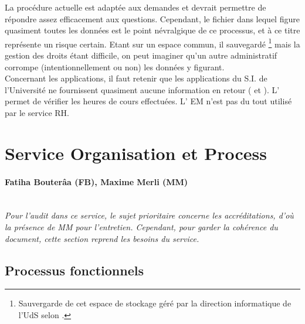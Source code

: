 \documentclass{book}
\begin{document}
La procédure actuelle est adaptée aux  demandes et devrait permettre de répondre
assez  efficacement aux  questions.  Cependant, le  fichier   dans
lequel  figure quasiment  toutes  les données  est le  point  névralgique de  ce
processus,  et à  ce titre  représente un  risque certain.  Etant sur  un espace
commun, il sauvegardé%
\footnote{Sauvergarde  de  cet   espace  de  stockage  géré   par  la  direction
  informatique  de  l'UdS  selon  \CK.   } mais  la  gestion  des  droits  étant
difficile,    on   peut    imaginer   qu'un    autre   administratif    corrompe
(intentionnellement ou non) les données y figurant.\\

Concernant les  applications, il faut  retenir que  les applications du  S.I. de
l'Université   ne   fournissent   quasiment   aucune   information   en   retour
(  et ).  L' permet  de vérifier  les
heures de cours effectuées. L' EM n'est pas du tout utilisé par
le service RH.
 



\section{Service Organisation et Process}

\paragraph{Fatiha Bouterâa (FB), Maxime Merli (MM)} 
~\\

\textit{Pour  l'audit  dans  ce  service,  le  sujet  prioritaire  concerne  les
  accréditations,  d'où la  présence  de MM  pour  l'entretien. Cependant,  pour
  garder  la  cohérence  du  document,  cette section  reprend  les  besoins  du
  service.}

\subsection{Processus fonctionnels}
\label{sc:sop-process}
\end{document}
